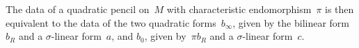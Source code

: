 \documentclass{article}
\begin{document}
The data of a quadratic pencil on~$M$ with characteristic
endomorphism~$π$ is then equivalent to the data of the two quadratic
forms~$b_{∞}$, given by the bilinear form~$b_R$ and a $σ$-linear
form~$a$, and $b_{0}$, given by~$π b_R$ and a $σ$-linear form~$c$.



% 
% 
% 
% 
% 
\end{document}
